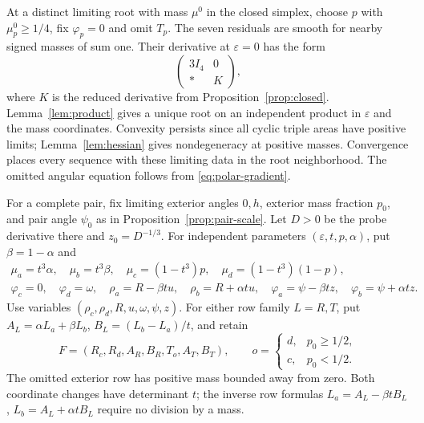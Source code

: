 \documentclass[11pt,a4paper]{article}
\numberwithin{equation}{section}
\theoremstyle{remark}
\newcommand{\eps}{\varepsilon}
\begin{document}
At a distinct limiting root with mass $\mu^0$ in the closed simplex, choose $p$ with $\mu_p^0\ge1/4$, fix $\varphi_p=0$ and omit $T_p$. The seven residuals are smooth for nearby signed masses of sum one. Their derivative at $\eps=0$ has the form
\[
 \begin{pmatrix}3I_4&0\\ *&K\end{pmatrix},
\]
where $K$ is the reduced derivative from Proposition~\ref{prop:closed}. Lemma~\ref{lem:product} gives a unique root on an independent product in $\eps$ and the mass coordinates. Convexity persists since all cyclic triple areas have positive limits; Lemma~\ref{lem:hessian} gives nondegeneracy at positive masses. Convergence places every sequence with these limiting data in the root neighborhood. The omitted angular equation follows from \eqref{eq:polar-gradient}.

For a complete pair, fix limiting exterior angles $0,h$, exterior mass fraction $p_0$, and pair angle $\psi_0$ as in Proposition~\ref{prop:pair-scale}. Let $D>0$ be the probe derivative there and $z_0=D^{-1/3}$. For independent parameters $(\eps,t,p,\alpha)$, put $\beta=1-\alpha$ and
\begin{gather}
 \mu_a=t^3\alpha,\quad\mu_b=t^3\beta,\quad
 \mu_c=(1-t^3)p,\quad\mu_d=(1-t^3)(1-p),\label{eq:pair-chart-mass}\\
 \varphi_c=0,\quad\varphi_d=\omega,\quad
 \rho_a=R-\beta tu,\quad\rho_b=R+\alpha tu,\quad
 \varphi_a=\psi-\beta tz,\quad\varphi_b=\psi+\alpha tz.\label{eq:pair-coordinates}
\end{gather}
Use variables $(\rho_c,\rho_d,R,u,\omega,\psi,z)$. For either row family $L=R,T$, put $A_L=\alpha L_a+\beta L_b$, $B_L=(L_b-L_a)/t$, and retain
\[
 F=(R_c,R_d,A_R,B_R,T_o,A_T,B_T),\qquad
 o=\begin{cases}d,&p_0\ge1/2,\\c,&p_0<1/2.\end{cases}
\]
The omitted exterior row has positive mass bounded away from zero. Both coordinate changes have determinant $t$; the inverse row formulas $L_a=A_L-\beta tB_L$, $L_b=A_L+\alpha tB_L$ require no division by a mass.
\end{document}
